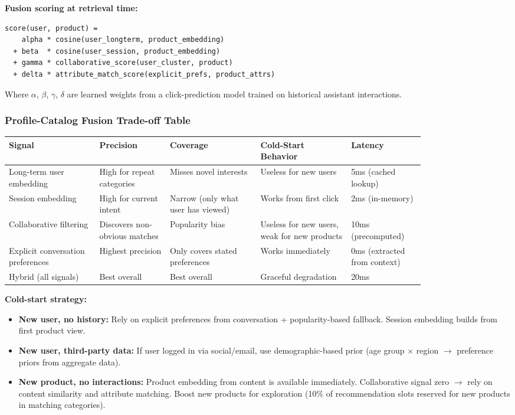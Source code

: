 \textbf{Fusion scoring at retrieval time:}

\begin{verbatim}
score(user, product) =
    alpha * cosine(user_longterm, product_embedding)
  + beta  * cosine(user_session, product_embedding)
  + gamma * collaborative_score(user_cluster, product)
  + delta * attribute_match_score(explicit_prefs, product_attrs)
\end{verbatim}

Where $\alpha$, $\beta$, $\gamma$, $\delta$ are learned weights from a click-prediction model trained on historical assistant interactions.

\subsubsection*{Profile-Catalog Fusion Trade-off Table}

\begin{tabular}{|p{0.18\linewidth}|p{0.14\linewidth}|p{0.18\linewidth}|p{0.18\linewidth}|p{0.14\linewidth}|}
\hline
\textbf{Signal} & \textbf{Precision} & \textbf{Coverage} & \textbf{Cold-Start Behavior} & \textbf{Latency} \\
\hline
Long-term user embedding & High for repeat categories & Misses novel interests & Useless for new users & 5ms (cached lookup) \\
\hline
Session embedding & High for current intent & Narrow (only what user has viewed) & Works from first click & 2ms (in-memory) \\
\hline
Collaborative filtering & Discovers non-obvious matches & Popularity bias & Useless for new users, weak for new products & 10ms (precomputed) \\
\hline
Explicit conversation preferences & Highest precision & Only covers stated preferences & Works immediately & 0ms (extracted from context) \\
\hline
Hybrid (all signals) & Best overall & Best overall & Graceful degradation & 20ms \\
\hline
\end{tabular}

\textbf{Cold-start strategy:}

\begin{itemize}
  \item \textbf{New user, no history:} Rely on explicit preferences from conversation + popularity-based fallback. Session embedding builds from first product view.
  \item \textbf{New user, third-party data:} If user logged in via social/email, use demographic-based prior (age group $\times$ region $\rightarrow$ preference priors from aggregate data).
  \item \textbf{New product, no interactions:} Product embedding from content is available immediately. Collaborative signal zero $\rightarrow$ rely on content similarity and attribute matching. Boost new products for exploration (10\% of recommendation slots reserved for new products in matching categories).
\end{itemize}

